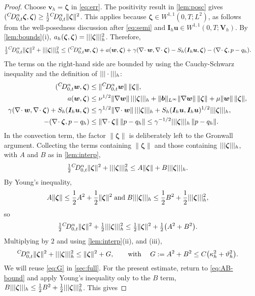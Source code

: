 \begin{proof}
Choose $\bm v_h=\bm\zeta$ in \eqref{eq:err}. The positivity result in \cref{lem:posc} gives $({}^{C}\!D_{0,t}^{\alpha}\bm\zeta,\bm\zeta)\ge\frac12{}^{C}\!D_{0,t}^{\alpha}\|\bm\zeta\|^2$. This applies because $\bm\zeta\in W^{1,1}(0,T;L^2)$, as follows from the well-posedness discussion after \eqref{eq:semi} and $\bm I_h\bm u\in W^{1,1}(0,T;\bm V_h)$. By \cref{lem:bounds}(i), $a_h(\bm\zeta,\bm\zeta)=|||\bm\zeta|||_h^2$. Therefore,
\[
\tfrac12{}^{C}\!D_{0,t}^{\alpha}\|\bm\zeta\|^2+|||\bm\zeta|||_h^2\le({}^{C}\!D_{0,t}^{\alpha}\bm w,\bm\zeta)+a(\bm w,\bm\zeta)+\gamma(\nabla\!\cdot\bm w,\nabla\!\cdot\bm\zeta)-S_h(\bm I_h\bm u,\bm\zeta)-(\nabla\!\cdot\bm\zeta,p-q_h).
\]
The terms on the right-hand side are bounded by using the Cauchy-Schwarz inequality and the definition of $|||\cdot|||_h$:
\[
\begin{aligned}
({}^{C}\!D_{0,t}^{\alpha}\bm w,\bm\zeta)&\le\|{}^{C}\!D_{0,t}^{\alpha}\bm w\|\,\|\bm\zeta\|,\\
a(\bm w,\bm\zeta) &\le \nu^{1/2}\|\nabla\bm w\|\,|||\bm\zeta|||_h + \|\boldsymbol b\|_{L^\infty}\|\nabla\bm w\|\,\|\bm\zeta\|+\mu\|\bm w\|\,\|\bm\zeta\|,\\
\gamma(\nabla\!\cdot\bm w,\nabla\!\cdot\bm\zeta)+
S_h(\bm I_h\bm u,\bm\zeta)&\le \gamma^{1/2}\|\nabla\!\cdot\bm w\|\,|||\bm\zeta|||_h + S_h(\bm I_h\bm u,\bm I_h\bm u)^{1/2}|||\bm\zeta|||_h,\\
-(\nabla\!\cdot\bm\zeta,p-q_h)&\le\|\nabla\!\cdot\bm\zeta\|\,\|p-q_h\|\le\gamma^{-1/2}|||\bm\zeta|||_h\,\|p-q_h\| .
\end{aligned}
\]
In the convection term, the factor $\|\bm\zeta\|$ is deliberately left to the Gronwall argument. Collecting the terms containing $\|\bm\zeta\|$ and those containing $|||\bm\zeta|||_h$, with $A$ and $B$ as in \cref{lem:interp},
\begin{equation}\label{eq:AB-bound}
\tfrac12{}^{C}\!D_{0,t}^{\alpha}\|\bm\zeta\|^2+|||\bm\zeta|||_h^2\le A\|\bm\zeta\|+B|||\bm\zeta|||_h .
\end{equation}
By Young's inequality, 
$$A\|\bm\zeta\|\le\frac12A^2+\frac12\|\bm\zeta\|^2\; \text{and}\; B|||\bm\zeta|||_h\le\frac12B^2+\frac12|||\bm\zeta|||_h^2,$$ so
\[
\tfrac12{}^{C}\!D_{0,t}^{\alpha}\|\bm\zeta\|^2+\tfrac12|||\bm\zeta|||_h^2\le\tfrac12\|\bm\zeta\|^2+\tfrac12\bigl(A^2+B^2\bigr).
\]
Multiplying by $2$ and using \cref{lem:interp}(ii), and (iii),
\begin{equation}\label{eq:G}
{}^{C}\!D_{0,t}^{\alpha}\|\bm\zeta\|^2+|||\bm\zeta|||_h^2\le\|\bm\zeta\|^2+G,\qquad\text{with}\;
\quad G:=A^2+B^2\le C\bigl(\kappa_h^2+\vartheta_h^2\bigr).
\end{equation}
We will reuse \eqref{eq:G} in \cref{sec:full}. For the present estimate, return to \eqref{eq:AB-bound} and apply Young's inequality only to the $B$ term, $B|||\bm\zeta|||_h\le\frac12B^2+\frac12|||\bm\zeta|||_h^2$. This gives

\end{proof}
